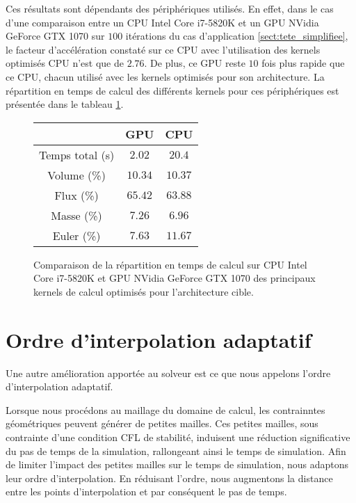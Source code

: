 Ces résultats sont dépendants des périphériques utilisés. En effet,
dans le cas d'une comparaison entre un CPU Intel Core i7-5820K et un
GPU NVidia GeForce GTX 1070 sur $100$ itérations du cas d'application
\ref{sect:tete_simplifiee}, le facteur d'accélération constaté sur ce CPU
avec l'utilisation des kernels optimisés CPU n'est que de $2.76$.
De plus, ce GPU reste $10$ fois plus rapide que ce CPU, chacun utilisé
avec les kernels optimisés pour son architecture.
La répartition en temps de calcul des différents kernels pour ces périphériques est présentée
dans le tableau \ref{tab:comp_cpu_gpu_other}.
\\

\begin{figure}[!h]
	\begin{center}
		\caption{
			\label{tab:comp_cpu_gpu_other}
			Comparaison de la répartition en temps de calcul sur CPU Intel Core i7-5820K et GPU NVidia GeForce GTX 1070 des
			principaux kernels
			de calcul optimisés pour l'architecture cible.
		}
		
		\begin{tabular}{|c|c|c|}
			\hline
			& GPU & CPU \\ \hline\hline
			Temps total (s) & $2.02$ & $20.4$ \\	\hline
			Volume (\%) & $10.34$ & $10.37$ \\	\hline
			Flux (\%) & $65.42$ & $63.88$ \\	\hline
			Masse (\%) & $7.26$ & $6.96$ \\	\hline
			Euler (\%) & $7.63$ & $11.67$ \\	\hline
		\end{tabular}
	\end{center}
\end{figure}




\section{Ordre d'interpolation adaptatif}
\label{sect:ordre_adaptatif}


Une autre amélioration apportée au solveur est ce que nous appelons
l'ordre d'interpolation adaptatif.

Lorsque nous procédons au maillage du domaine de calcul, les contrainntes
géométriques peuvent générer de petites mailles.
Ces petites mailles, sous contrainte d'une condition CFL de stabilité,
induisent une réduction significative du pas de temps de la simulation,
rallongeant ainsi le temps de simulation.
Afin de limiter l'impact des petites mailles sur le temps de simulation,
nous adaptons leur ordre d'interpolation.
En réduisant l'ordre, nous augmentons la distance entre les points 
d'interpolation et par conséquent le pas de temps.

